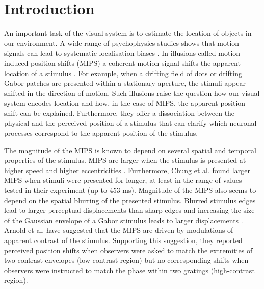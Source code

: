 \section{Introduction}
An important task of the visual system is to estimate the location of objects in our environment. A wide range of psychophysics studies shows that motion signals can lead to systematic localisation biases \parencite{Ramachandran1990, DeValois1991, Nishida1999, Fu2001, McGraw2002, Chung2007, Arnold2007, Eagleman2007, Kwon2015}. In illusions called motion-induced position shifts (MIPS) a coherent motion signal shifts the apparent location of a stimulus \parencite{Ramachandran1990}. For example, when a drifting field of dots \parencite{Ramachandran1990} or drifting Gabor patches \parencite{DeValois1991, Chung2007, Arnold2007} are presented within a stationary aperture, the stimuli appear shifted in the direction of motion. Such illusions raise the question how our visual system encodes location and how, in the case of MIPS, the apparent position shift can be explained. Furthermore, they offer a dissociation between the physical and the perceived position of a stimulus that can clarify which neuronal processes correspond to the apparent position of the stimulus.

The magnitude of the MIPS is known to depend on several spatial and temporal properties of the stimulus. MIPS are larger when the stimulus is presented at higher speed \parencite{Chung2007, Kwon2015} and higher eccentricities \parencite{Fu2004, Chung2007, Kwon2015}. Furthermore, Chung et al. \parencite*{Chung2007} found larger MIPS when stimuli were presented for longer, at least in the range of values tested in their experiment (up to 453 ms). Magnitude of the MIPS also seems to depend on the spatial blurring of the presented stimulus. Blurred stimulus edges lead to larger perceptual displacements than sharp edges \parencite{Fu2001, Kwon2015} and increasing the size of the Gaussian envelope of a Gabor stimulus leads to larger displacements \parencite{Fu2001}. Arnold et al. \parencite*{Arnold2007} have suggested that the MIPS are driven by modulations of apparent contrast of the stimulus. Supporting this suggestion, they reported perceived position shifts when observers were asked to match the extremities of two contrast envelopes (low-contrast region) but no corresponding shifts when observers were instructed to match the phase within two gratings (high-contrast region).

